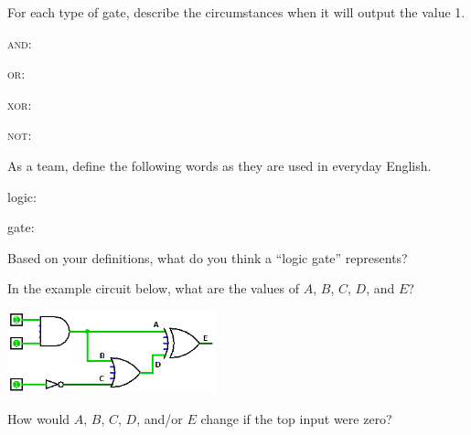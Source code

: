 \begin{answer}
\end{answer}


\Q For each type of gate, describe the circumstances when it will output the value 1.

\begin{description}
\item \textsc{and}:
\item \textsc{or}:
\item \textsc{xor}:
\item \textsc{not}:
\end{description}


\Q As a team, define the following words as they are used in everyday English.

\begin{description}
\item logic:
\item gate:
\end{description}


\Q Based on your definitions, what do you think a ``logic gate'' represents?

\begin{answer}
\end{answer}


\Q In the example circuit below, what are the values of $A$, $B$, $C$, $D$, and $E$?

\vspace{1em}
\includegraphics[width=0.45\textwidth]{CSP/logic-example.png}
\vspace{1em}


\Q How would $A$, $B$, $C$, $D$, and/or $E$ change if the top input were zero?

\begin{answer}
\end{answer}
